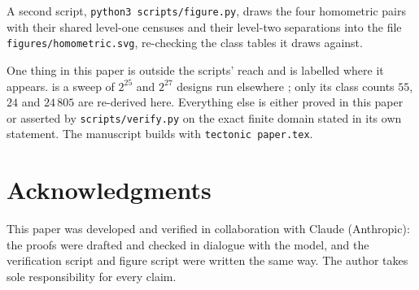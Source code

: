 \documentclass[11pt]{amsart}
\theoremstyle{definition}
\theoremstyle{remark}
\begin{document}
A second script, \texttt{python3 scripts/figure.py}, draws the four homometric pairs with their shared level-one censuses and their level-two separations into the file \texttt{figures/homometric.svg}, re-checking the class tables it draws against.

One thing in this paper is outside the scripts' reach and is labelled where it appears.  is a sweep of $2^{25}$ and $2^{27}$ designs run elsewhere \cite{tree}; only its class counts $55$, $24$ and $24\,805$ are re-derived here. Everything else is either proved in this paper or asserted by \texttt{scripts/verify.py} on the exact finite domain stated in its own statement. The manuscript builds with \texttt{tectonic paper.tex}.

\section*{Acknowledgments}

This paper was developed and verified in collaboration with Claude (Anthropic): the proofs were drafted and checked in dialogue with the model, and the verification script and figure script were written the same way. The author takes sole responsibility for every claim.

\end{document}
